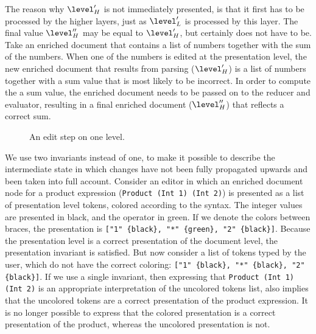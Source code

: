 The reason why $\level'_{H}$ is not immediately presented, is that it first has to be processed by the higher layers, just as $\level'_{L}$ is processed by this layer. The final value $\level''_{H}$ may be equal to $\level'_{H}$, but certainly does not have to be. Take an enriched document that contains a list of numbers together with the sum of the numbers. When one of the numbers is edited at the presentation level, the new enriched document that results from parsing ($\level'_{H}$) is a list of numbers together with a sum value that is most likely to be incorrect. In order to compute the a sum value, the enriched document needs to be passed on to the reducer and evaluator, resulting in a final enriched document ($\level''_{H}$) that reflects a correct sum.

\begin{figure}
\begin{small}
\begin{center}
\begin{center}
\end{center}\caption{An edit step on one level.}\label{layerEditProcess} 
\end{center}
\end{small}
\end{figure}

We use two invariants instead of one, to make it possible to describe the intermediate state in which changes have not been fully propagated upwards and been taken into full account. Consider an editor in which an enriched document node for a product expression (\verb|Product (Int 1) (Int 2)|) is presented as a list of presentation level tokens, colored according to the syntax. The integer values are presented in black, and the operator in green. If we denote the colors between braces, the presentation is \verb|["1" {black}, "*" {green}, "2" {black}]|. Because the presentation level is a correct presentation of the document level, the presentation invariant is satisfied. But now consider a list of tokens typed by the user, which do not have the correct coloring: \verb|["1" {black}, "*" {black}, "2" {black}]|. If we use a single invariant, then expressing that \verb|Product (Int 1) (Int 2)| is an appropriate interpretation of the uncolored tokens list, also implies that the uncolored tokens are a correct presentation of the product expression. It is no longer possible to express that the colored presentation is a correct presentation of the product, whereas the uncolored presentation is not. 

